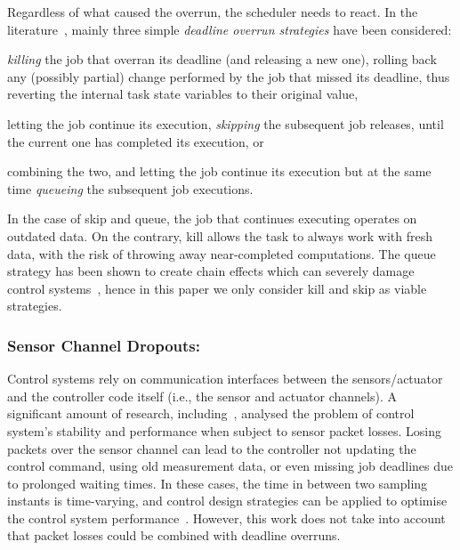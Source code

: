 Regardless of what caused the overrun, the scheduler needs to react.
In the literature~\cite{Cervin:2005}, mainly three simple \emph{deadline overrun strategies} have been considered:
%
\begin{enumerate*}[label=(\roman*)]
    \item \emph{killing} the job that overran its deadline (and releasing a new one), rolling back any (possibly partial) change performed by the job that missed its deadline, thus reverting the internal task state variables to their original value,
    \item letting the job continue its execution, \emph{skipping} the subsequent job releases, until the current one has completed its execution, or
    \item combining the two, and letting the job continue its execution but at the same time \emph{queueing} the subsequent job executions.
\end{enumerate*}
%
In the case of skip and queue, the job that continues executing operates on outdated data.
On the contrary, kill allows the task to always work with fresh data, with the risk of throwing away near-completed computations.
The queue strategy has been shown to create chain effects which can severely damage control systems~\cite{Cervin:2005, Maggio:2020}, hence in this paper we only consider kill and skip as viable strategies.

\subsubsection*{Sensor Channel Dropouts:}
Control systems rely on communication interfaces between the sensors/actuator and the controller code itself (i.e., the sensor and actuator channels).
A significant amount of research, including~\cite{Ling:2002, Linsenmayer:2017, Kauer:2014, Goswami:2014}, analysed the problem of control system's stability and performance when subject to sensor packet losses.
Losing packets over the sensor channel can lead to the controller not updating the control command, using old measurement data, or even missing job deadlines due to prolonged waiting times.
In these cases, the time in between two sampling instants is time-varying, and control design strategies can be applied to optimise the control system performance~\cite{Ghosh:2018, Schinkel:2002}.
However, this work does not take into account that packet losses could be combined with deadline overruns.

